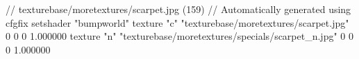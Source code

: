 // texturebase/moretextures/scarpet.jpg (159)
// Automatically generated using cfgfix
setshader "bumpworld"
texture "c" "texturebase/moretextures/scarpet.jpg" 0 0 0 1.000000
texture "n" "texturebase/moretextures/specials/scarpet_n.jpg" 0 0 0 1.000000
